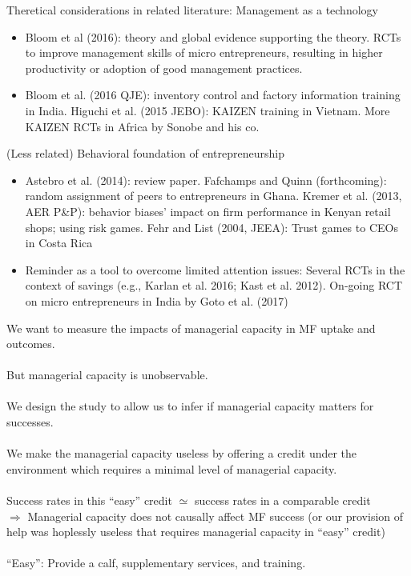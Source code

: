 \begin{frame}{}
Theretical considerations in related literature: Management as a technology
\begin{itemize}
\vspace{1.0ex}\setlength{\itemsep}{1.0ex}\setlength{\baselineskip}{12pt}
\pause
\item	Bloom et al (2016): theory and global evidence supporting the theory. RCTs to improve management skills of micro entrepreneurs, resulting in higher productivity or adoption of good management practices.
\pause
\item	Bloom et al. (2016 QJE): inventory control and factory information training in India. Higuchi et al. (2015 JEBO): KAIZEN training in Vietnam. More KAIZEN RCTs in Africa by Sonobe and his co.
\end{itemize}
\pause
(Less related) Behavioral foundation of entrepreneurship
\begin{itemize}
\vspace{1.0ex}\setlength{\itemsep}{1.0ex}\setlength{\baselineskip}{12pt}
\item	Astebro et al. (2014): review paper. Fafchamps and Quinn (forthcoming): random assignment of peers to entrepreneurs in Ghana. Kremer et al. (2013, AER P\&P): behavior biases' impact on firm performance in Kenyan retail shops; using risk games. Fehr and List (2004, JEEA): Trust games to CEOs in Costa Rica
\item	Reminder as a tool to overcome limited attention issues: Several RCTs in the context of savings (e.g., Karlan et al. 2016; Kast et al. 2012). On-going RCT on micro entrepreneurs in India by Goto et al. (2017)
\end{itemize}
\end{frame}

\begin{frame}{}
We want to measure the impacts of managerial capacity in MF uptake and outcomes.\\~\\
\pause
But managerial capacity is unobservable.\\~\\
\pause
We design the study to allow us to infer if managerial capacity matters for successes.\\~\\
\pause
We make the managerial capacity useless by offering a credit under the environment which requires a minimal level of managerial capacity.\\~\\
\pause
Success rates in this ``easy'' credit $\simeq$ success rates in a comparable credit\\
\pause
$\Rightarrow$ Managerial capacity does not causally affect MF success \pause (or our provision of help was hoplessly useless that requires managerial capacity in ``easy'' credit)\\~\\

``Easy'': Provide a calf, supplementary services, and training.
\end{frame}



